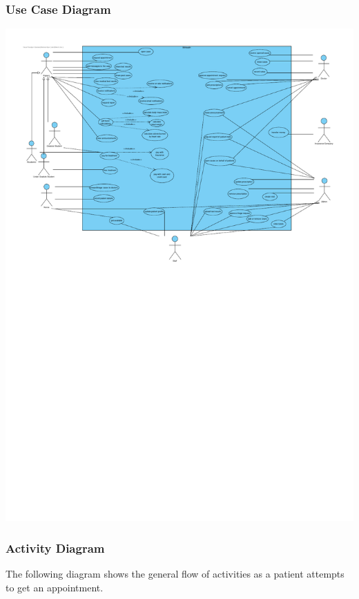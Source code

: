 \documentclass[a4paper, 12pt, titlepage]{article}
\begin{document}
  \subsubsection{Use Case Diagram}

  \includegraphics[width=\linewidth]{use_case_diag}

  \pagebreak
  \subsubsection{Activity Diagram}

  The following diagram shows the general flow of activities as a patient attempts to get an appointment.
\end{document}
